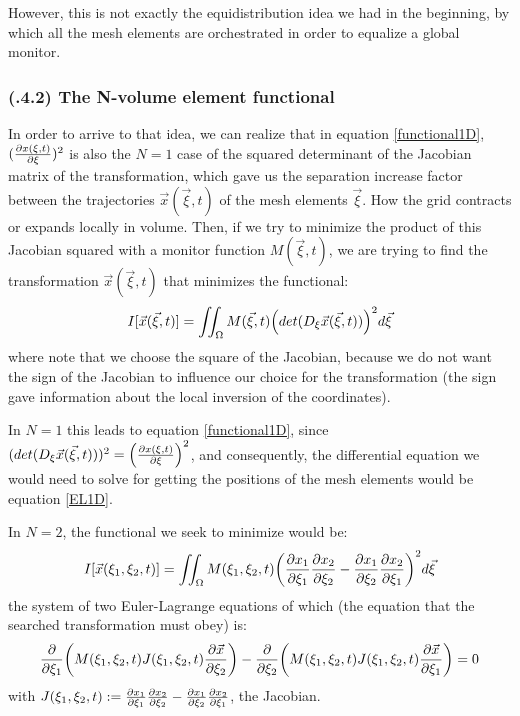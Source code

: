 \documentclass[11pt, a4paper]{article} %
\begin{document}
However, this is not exactly the equidistribution idea we had in the beginning, by which all the mesh elements are orchestrated in order to equalize a global monitor.

\subsubsection*{\bf (\textgamma.4.2) The N-volume element functional}
In order to arrive to that idea, we can realize that in equation \eqref{functional1D}, $(\pdv{x(\xi,t)}{\xi})^2$ is also the $N=1$ case of the squared determinant of the Jacobian matrix of the transformation, which gave us the separation increase factor between the trajectories $\vec{x}(\vec{\xi},t)$ of the mesh elements $\vec{\xi}$. How the grid contracts or expands locally in volume. Then, if we try to minimize the product of this Jacobian squared with a monitor function $M(\vec{\xi},t)$, we are trying to find the transformation $\vec{x}(\vec{\xi},t)$ that minimizes the functional:
\begin{equation}
I[\vec{x}(\vec{\xi},t)]=\iint_\Omega M(\vec{\xi},t) \qty(det(D_\xi \vec{x}(\vec{\xi},t)))^2 d\vec{\xi}
\end{equation}
where note that we choose the square of the Jacobian, because we do not want the sign of the Jacobian to influence our choice for the transformation (the sign gave information about the local inversion of the coordinates).

In $N=1$ this leads to equation \eqref{functional1D}, since $(det(D_\xi \vec{x}(\vec{\xi},t)))^2=\qty(\pdv{x(\xi,t)}{\xi})^2$, and consequently, the differential equation we would need to solve for getting the positions of the mesh elements would be equation \eqref{EL1D}.

In $N=2$, the functional we seek to minimize would be:
\begin{equation}
I[\vec{x}(\xi_1,\xi_2 ,t)]=\iint_\Omega M(\xi_1, \xi_2,t) \qty( \pdv{x_1}{\xi_1}\pdv{x_2}{\xi_2} - \pdv{x_1}{\xi_2} \pdv{x_2}{\xi_1})^2 d\vec{\xi}
\end{equation}
the system of two Euler-Lagrange equations of which (the equation that the searched transformation must obey) is:
\begin{equation}
\pdv{}{\xi_1}\qty(M(\xi_1,\xi_2,t)J(\xi_1,\xi_2,t)\pdv{\vec{x}}{\xi_2})-\pdv{}{\xi_2}\qty(M(\xi_1,\xi_2,t)J(\xi_1,\xi_2,t)\pdv{\vec{x}}{\xi_1})=0
\end{equation}
with $J(\xi_1,\xi_2,t):=\pdv{x_1}{\xi_1}\pdv{x_2}{\xi_2} - \pdv{x_1}{\xi_2} \pdv{x_2}{\xi_1}$, the Jacobian.
\end{document}
